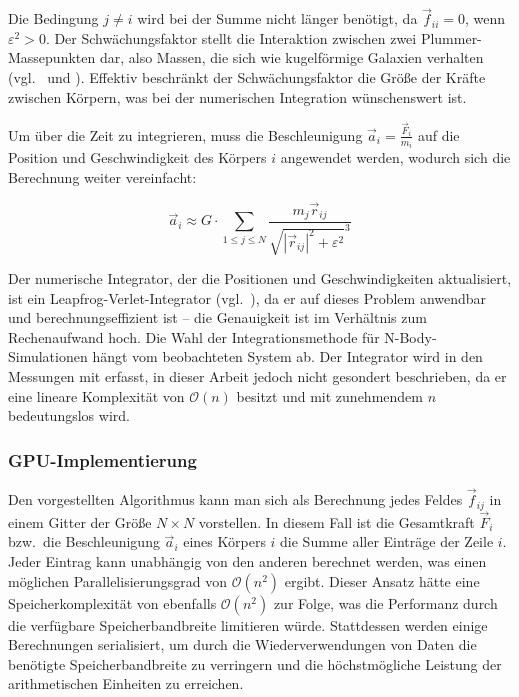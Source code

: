 Die Bedingung $j \neq i$ wird bei der Summe nicht länger benötigt, da
$\vec{f}_{ii} = 0$, wenn $\varepsilon^2 > 0$. Der Schwächungsfaktor stellt die
Interaktion zwischen zwei Plummer-Massepunkten dar, also Massen, die sich wie
kugelförmige Galaxien verhalten (vgl.~\cite{aarseth2003} und \cite{dyer1993}).
Effektiv beschränkt der Schwächungsfaktor die Größe der Kräfte zwischen Körpern,
was bei der numerischen Integration wünschenswert ist.

Um über die Zeit zu integrieren, muss die Beschleunigung
$\vec{a}_i = \frac{\vec{F}_i}{m_i}$ auf die Position und Geschwindigkeit des
Körpers $i$ angewendet werden, wodurch sich die Berechnung weiter vereinfacht:

\[
    \vec{a}_i \approx G \cdot \sum\limits_{1 \leq j \leq N}
                      \frac{m_j \vec{r}_{ij}}
                           {\sqrt{|\vec{r}_{ij}|^2 + \varepsilon^2}^3}
\]

Der numerische Integrator, der die Positionen und Geschwindigkeiten
aktualisiert, ist ein Leapfrog-Verlet-Integrator (vgl.~\cite{verlet1967}), da er
auf dieses Problem anwendbar und berechnungseffizient ist -- die Genauigkeit
ist im Verhältnis zum Rechenaufwand hoch. Die Wahl der Integrationsmethode für
N-Body-Simulationen hängt vom beobachteten System ab. Der Integrator wird in
den Messungen mit erfasst, in dieser Arbeit jedoch nicht gesondert beschrieben,
da er eine lineare Komplexität von $\mathcal{O}(n)$ besitzt und mit zunehmendem
$n$ bedeutungslos wird.

\subsubsection{GPU-Implementierung}
\label{methoden:nbody:gpu}

Den vorgestellten Algorithmus kann man sich als Berechnung jedes Feldes
$\vec{f}_{ij}$ in einem Gitter der Größe $N \times N$ vorstellen. In diesem Fall
ist die Gesamtkraft $\vec{F}_i$ bzw.\ die Beschleunigung $\vec{a}_i$ eines
Körpers $i$ die Summe aller Einträge der Zeile $i$. Jeder Eintrag kann
unabhängig von den anderen berechnet werden, was einen möglichen
Parallelisierungsgrad von $\mathcal{O}(n^2)$ ergibt. Dieser Ansatz hätte eine
Speicherkomplexität von ebenfalls $\mathcal{O}(n^2)$ zur Folge, was die
Performanz durch die verfügbare Speicherbandbreite limitieren würde. Stattdessen
werden einige Berechnungen serialisiert, um durch die Wiederverwendungen von
Daten die benötigte Speicherbandbreite zu verringern und die höchstmögliche
Leistung der arithmetischen Einheiten zu erreichen.

